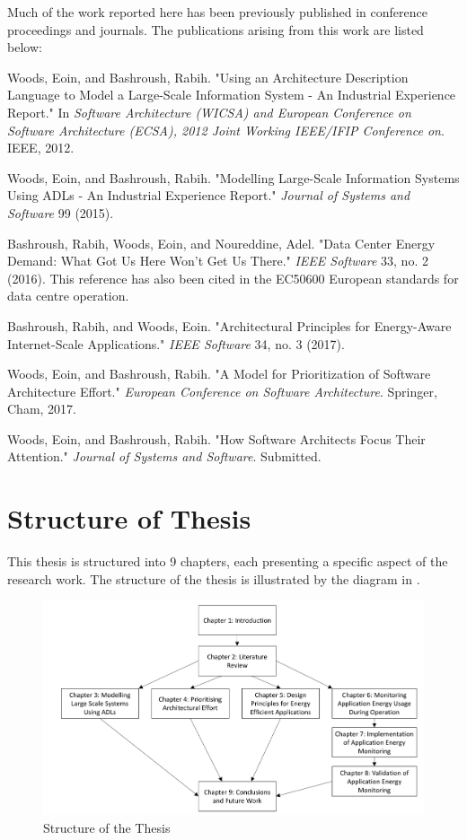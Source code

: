 Much of the work reported here has been previously published in conference proceedings and journals. The publications arising from this work are listed below: \nopagebreak
\begin{description}
	\item Woods, Eoin, and Bashroush, Rabih. "Using an Architecture Description Language to Model a Large-Scale Information System - An Industrial Experience Report." In \emph{Software Architecture (WICSA) and European Conference on Software Architecture (ECSA), 2012 Joint Working IEEE/IFIP Conference on}. IEEE, 2012.
	\item Woods, Eoin, and Bashroush, Rabih. "Modelling Large-Scale Information Systems Using ADLs - An Industrial Experience Report." \emph{Journal of Systems and Software} 99 (2015).
	\item Bashroush, Rabih, Woods, Eoin, and Noureddine, Adel. "Data Center Energy Demand: What Got Us Here Won't Get Us There." \emph{IEEE Software} 33, no. 2 (2016).  This reference has also been cited in the EC50600 European standards for data centre operation.
	\item Bashroush, Rabih, and Woods, Eoin. "Architectural Principles for Energy-Aware Internet-Scale Applications." \emph{IEEE Software} 34, no. 3 (2017).
	\item Woods, Eoin, and Bashroush, Rabih. "A Model for Prioritization of Software Architecture Effort." \emph{European Conference on Software Architecture}. Springer, Cham, 2017.
	\item Woods, Eoin, and Bashroush, Rabih. "How Software Architects Focus Their Attention." \emph{Journal of Systems and Software}.  Submitted.
\end{description}


\section{Structure of Thesis}

This thesis is structured into 9 chapters, each presenting a specific aspect of the research work.  The structure of the thesis is illustrated by the diagram in .

\begin{figure}[h]
\centering
\includegraphics[width=1.0\textwidth]{Figures/intro-chapters}
\caption{Structure of the Thesis}
\label{figure:intro-chapters}
\end{figure}

